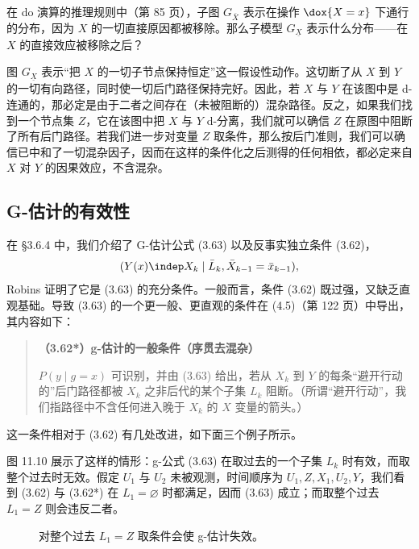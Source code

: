 
在 do 演算的推理规则中（第 85 页），子图 $G_{\bar X}$ 表示在操作 $\dox{X=x}$ 下通行的分布，因为 $X$ 的一切直接原因都被移除。那么子模型 $G_{\underline X}$ 表示什么分布——在 $X$ 的直接效应被移除之后？


图 $G_{\underline X}$ 表示“把 $X$ 的一切子节点保持恒定”这一假设性动作。这切断了从 $X$ 到 $Y$ 的一切有向路径，同时使一切后门路径保持完好。因此，若 $X$ 与 $Y$ 在该图中是 d-连通的，那必定是由于二者之间存在（未被阻断的）混杂路径。反之，如果我们找到一个节点集 $Z$，它在该图中把 $X$ 与 $Y$ d-分离，我们就可以确信 $Z$ 在原图中阻断了所有后门路径。若我们进一步对变量 $Z$ 取条件，那么按后门准则，我们可以确信已中和了一切混杂因子，因而在这样的条件化之后测得的任何相依，都必定来自 $X$ 对 $Y$ 的因果效应，不含混杂。

\subsection{G-估计的有效性}

在 \S 3.6.4 中，我们介绍了 G-估计公式 (3.63) 以及反事实独立条件 (3.62)，
\[
(Y(x)\indep X_k\mid \bar L_k,\bar X_{k-1}=\bar x_{k-1}),
\]
Robins 证明了它是 (3.63) 的充分条件。一般而言，条件 (3.62) 既过强，又缺乏直观基础。导致 (3.63) 的一个更一般、更直观的条件在 (4.5)（第 122 页）中导出，其内容如下：

\begin{quote}
\textbf{（3.62*）g-估计的一般条件（序贯去混杂）}

$P(y\mid g=x)$ 可识别，并由 (3.63) 给出，若从 $X_k$ 到 $Y$ 的每条“避开行动的”后门路径都被 $X_k$ 之非后代的某个子集 $L_k$ 阻断。（所谓“避开行动”，我们指路径中不含任何进入晚于 $X_k$ 的 $X$ 变量的箭头。）
\end{quote}

这一条件相对于 (3.62) 有几处改进，如下面三个例子所示。

\begin{example}\label{ex:11.3.1}
图 11.10 展示了这样的情形：g-公式 (3.63) 在取过去的一个子集 $L_k$ 时有效，而取整个过去时无效。假定 $U_1$ 与 $U_2$ 未被观测，时间顺序为 $U_1,Z,X_1,U_2,Y$，我们看到 (3.62) 与 (3.62*) 在 $L_1=\varnothing$ 时都满足，因而 (3.63) 成立；而取整个过去 $L_1=Z$ 则会违反二者。
\end{example}

\begin{figure}[htbp]
\centering
{}
\caption{对整个过去 $L_1=Z$ 取条件会使 g-估计失效。}
\label{fig:11.10}
\end{figure}

